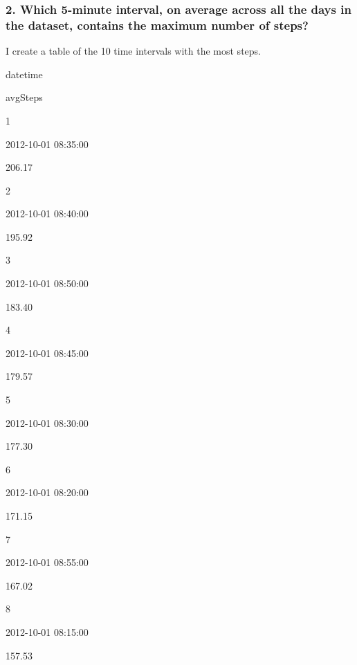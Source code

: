 \documentclass[]{article}
\newenvironment{Shaded}{\begin{snugshade}}{\end{snugshade}}
\newcommand{\KeywordTok}[1]{\textcolor[rgb]{0.13,0.29,0.53}{\textbf{#1}}}
\newcommand{\DataTypeTok}[1]{\textcolor[rgb]{0.13,0.29,0.53}{#1}}
\newcommand{\DecValTok}[1]{\textcolor[rgb]{0.00,0.00,0.81}{#1}}
\newcommand{\StringTok}[1]{\textcolor[rgb]{0.31,0.60,0.02}{#1}}
\newcommand{\OperatorTok}[1]{\textcolor[rgb]{0.81,0.36,0.00}{\textbf{#1}}}
\newcommand{\NormalTok}[1]{#1}
\begin{document}
\subsubsection{2. Which 5-minute interval, on average across all the
days in the dataset, contains the maximum number of
steps?}\label{which-5-minute-interval-on-average-across-all-the-days-in-the-dataset-contains-the-maximum-number-of-steps}

I create a table of the 10 time intervals with the most steps.

\begin{Shaded}
\end{Shaded}

datetime

avgSteps

1

2012-10-01 08:35:00

206.17

2

2012-10-01 08:40:00

195.92

3

2012-10-01 08:50:00

183.40

4

2012-10-01 08:45:00

179.57

5

2012-10-01 08:30:00

177.30

6

2012-10-01 08:20:00

171.15

7

2012-10-01 08:55:00

167.02

8

2012-10-01 08:15:00

157.53
\end{document}
